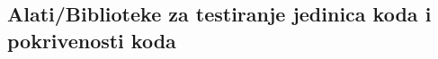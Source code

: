 \subsection{Alati/Biblioteke za testiranje jedinica koda i pokrivenosti koda}\label{alatibiblioteke-za-testiranje-jedinica-koda-i-pokrivenosti-koda}
